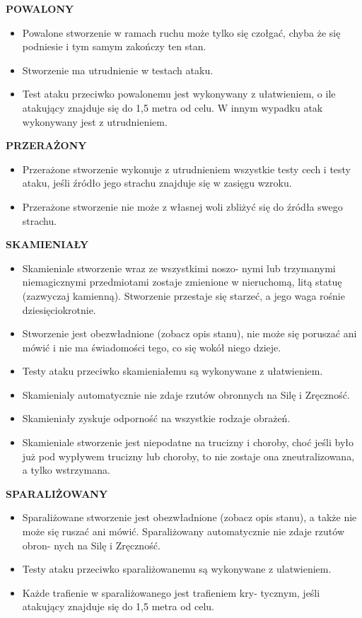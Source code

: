 \documentclass[14pt]{article}
\begin{document}
\textbf{POWALONY}
\begin{itemize}
    \item Powalone stworzenie w ramach ruchu może tylko się czołgać, chyba że się podniesie i tym samym zakończy ten stan.
    \item Stworzenie ma utrudnienie w testach ataku.
    \item Test ataku przeciwko powalonemu jest wykonywany z ułatwieniem, o ile atakujący znajduje się do 1,5 metra od celu. W innym wypadku atak wykonywany jest z utrudnieniem.
\end{itemize}

\textbf{PRZERAŻONY}
\begin{itemize}
    \item Przerażone stworzenie wykonuje z utrudnieniem wszystkie testy cech i testy ataku, jeśli źródło jego strachu znajduje się w zasięgu wzroku.
    \item Przerażone stworzenie nie może z własnej woli zbliżyć się do źródła swego strachu.
\end{itemize}
\newpage

\textbf{SKAMIENIAŁY}
\begin{itemize}
    \item Skamieniale stworzenie wraz ze wszystkimi noszo- nymi lub trzymanymi niemagicznymi przedmiotami zostaje zmienione w nieruchomą, litą statuę (zazwyczaj kamienną). Stworzenie przestaje się starzeć, a jego waga rośnie dziesięciokrotnie.
    \item Stworzenie jest obezwładnione (zobacz opis stanu), nie może się poruszać ani mówić i nie ma świadomości tego, co się wokół niego dzieje.
    \item Testy ataku przeciwko skamieniałemu są wykonywane z ułatwieniem.
    \item Skamienialy automatycznie nie zdaje rzutów obronnych na Silę i Zręczność.
    \item Skamieniały zyskuje odporność na wszystkie rodzaje obrażeń.
    \item Skamieniale stworzenie jest niepodatne na trucizny i choroby, choć jeśli było już pod wypływem trucizny lub choroby, to nie zostaje ona zneutralizowana, a tylko wstrzymana.
\end{itemize}

\textbf{SPARALIŻOWANY}
\begin{itemize}
    \item Sparaliżowane stworzenie jest obezwładnione (zobacz opis stanu), a także nie może się ruszać ani mówić. Sparaliżowany automatycznie nie zdaje rzutów obron- nych na Silę i Zręczność.
    \item Testy ataku przeciwko sparaliżowanemu są wykonywane z ulatwieniem.
    \item Każde trafienie w sparaliżowanego jest trafieniem kry- tycznym, jeśli atakujący znajduje się do 1,5 metra od celu.
\end{itemize}
\end{document}
